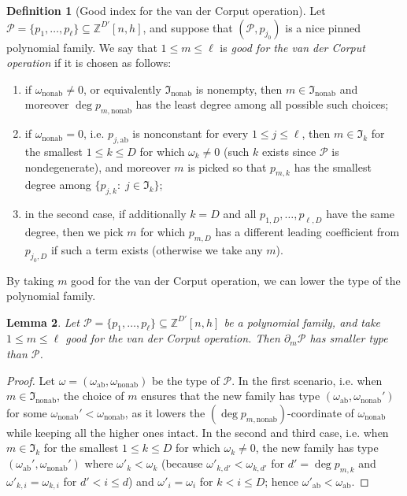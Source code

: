 \documentclass[11pt]{amsart}
\newtheorem{lemma}{Lemma}[section]
\theoremstyle{definition}
\newtheorem{definition}[lemma]{Definition}
\newcommand{\Z}{{\mathbb Z}}
\newcommand{\CP}{{\mathcal P}}
\newcommand{\FI}{{\mathfrak I}}
\newcommand{\1}{{\mathbf{1}}}
\newcommand{\ab}{{\mathrm{ab}}}
\newcommand{\nab}{{\mathrm{nonab}}}
\begin{document}
       \begin{definition}[Good index for the van der Corput operation]
       Let $\CP= \{p_1, \ldots, p_\ell\}\subseteq \Z^{D'}[n, h]$, and suppose that $(\CP,p_{j_{0}})$ is a nice pinned polynomial family. We say that $1\leq m\leq \ell$ is \textit{good for the van der Corput operation} if it is chosen as follows:
        \begin{enumerate}
            \item if $\omega_\nab \neq 0$, or equivalently $\FI_\nab$ is nonempty, then $m\in\FI_\nab$ and moreover $\deg p_{m,\nab}$ has the least degree among all possible such choices;
            \item if $\omega_\nab = 0$, i.e. $p_{j,\ab}$ is nonconstant for every $1\leq j\leq \ell$, then $m\in \FI_k$ for the smallest $1\leq k\leq D$ for which $\omega_k \neq 0$ (such $k$ exists since $\CP$ is nondegenerate), and moreover $m$ is picked so that $p_{m,k}$ has the smallest degree among $\{p_{j,k}\colon\; j\in\FI_k\}$;
            \item in the second case, if additionally $k=D$ and all $p_{1,D},\dots,p_{\ell,D}$ have the same degree, then we pick $m$ for which $p_{m,D}$ has a different leading coefficient from $p_{j_{0},D}$ if such a term exists (otherwise we take any $m$). 
        \end{enumerate}
       \end{definition}






       
        By taking $m$ good for the van der Corput operation, we can lower the type of the polynomial family.
       \begin{lemma}\label{L: type reduction}
         Let $\CP= \{p_1, \ldots, p_\ell\}\subseteq\Z^{D'}[n, h]$ be a polynomial family, and take $1\leq m\leq \ell$ \textit{good for the van der Corput operation}. Then $\partial_m\CP$ has smaller type than $\CP$.   
       \end{lemma}
       \begin{proof}
        Let $\omega = (\omega_\ab, \omega_\nab)$ be the type of $\CP$. In the first scenario, i.e. when $m\in\FI_\nab$, the choice of $m$ ensures that the new family has type $(\omega_\ab, \omega_\nab')$ for some $\omega_\nab'<\omega_\nab$, as it lowers the $(\deg p_{m,\nab})$-coordinate of $\omega_\nab$ while keeping all the higher ones intact. In the second and third case, i.e. when $m\in \FI_k$ for the smallest $1\leq k\leq D$ for which $\omega_k \neq 0$, the new family has type $(\omega_\ab', \omega_\nab')$ where $\omega'_{k} < \omega_{k}$ (because $\omega'_{k,d'}<\omega_{k,d'}$ for $d' = \deg p_{m,k}$ and $\omega'_{k,i}=\omega_{k,i}$ for $d'<i\leq d$) and $\omega'_{i} = \omega_{i}$ for $k<i\leq D$; hence $\omega'_\ab <\omega_\ab$. 
        \end{proof}
\end{document}
